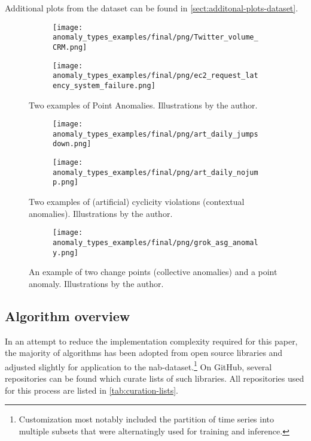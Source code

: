Additional plots from the dataset can be found in \cref{sect:additonal-plots-dataset}.

\begin{figure}[htp!]
    \centering
    \begin{subfigure}[t]{.49\linewidth}
        \centering
        \texttt{[image: anomaly\_types\_examples/final/png/Twitter\_volume\_CRM.png]}
    \end{subfigure}
    \begin{subfigure}[t]{.49\linewidth}
        \centering
        \texttt{[image: anomaly\_types\_examples/final/png/ec2\_request\_latency\_system\_failure.png]}
    \end{subfigure}
    \caption[Two examples of Point Anomalies.]{Two examples of Point Anomalies. Illustrations by the author.}\label{fig:point-anomalies-nab}
\end{figure}

\begin{figure}[htp!]
    \centering
    \begin{subfigure}[t]{.49\linewidth}
        \centering
        \texttt{[image: anomaly\_types\_examples/final/png/art\_daily\_jumpsdown.png]}
    \end{subfigure}
    \begin{subfigure}[t]{.49\linewidth}
        \centering
        \texttt{[image: anomaly\_types\_examples/final/png/art\_daily\_nojump.png]}
    \end{subfigure}
    \caption[Two examples of (artificial) cyclicity violations (contextual anomalies).]{Two examples of (artificial) cyclicity violations (contextual anomalies). Illustrations by the author.}\label{fig:contextual-anomalies-nab}
\end{figure}

\begin{figure}[htp!]
    \centering
    \begin{subfigure}[t]{.49\linewidth}
        \centering
        \texttt{[image: anomaly\_types\_examples/final/png/grok\_asg\_anomaly.png]}
    \end{subfigure}
    \caption[An example of two change points (collective anomalies)]{An example of two change points (collective anomalies) and a point anomaly. Illustrations by the author.}\label{fig:collective-anomalies-nab}
\end{figure}
\clearpage

\subsection{Algorithm overview}\label{subsect:algorithm-overview}
In an attempt to reduce the implementation complexity required for this paper,
the majority of algorithms has been adopted from open source libraries and
adjusted slightly for application to the \gls{nab}-dataset.\footnote{Customization most notably
included the partition of time series into multiple subsets that were alternatingly
used for training and inference.} On GitHub, several repositories can be found
which curate lists of such libraries. All repositories used for this process are
listed in \cref{tab:curation-lists}.

